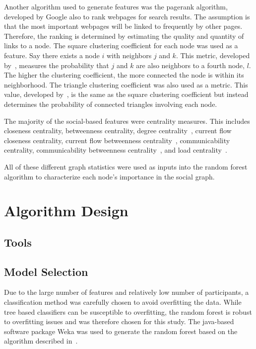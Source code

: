 \documentclass[12pt]{report}
\begin{document}
Another algorithm used to generate features was the pagerank algorithm, developed by Google \cite{page_pagerank_1999} also to rank webpages for search results.
The assumption is that the most important webpages will be linked to frequently by other pages.
Therefore, the ranking is determined by estimating the quality and quantity of links to a node.
The square clustering coefficient for each node was used as a feature.
Say there exists a node $i$ with neighbors $j$ and $k$.
This metric, developed by~\cite{lind_cycles_2005}, measures the probability that $j$ and $k$ are also neighbors to a fourth node, $l$.
The higher the clustering coefficient, the more connected the node is within its neighborhood.
The triangle clustering coefficient was also used as a metric.
This value, developed by~\cite{saramaki_generalizations_2007}, is the same as the square clustering coefficient but instead determines the probability of connected triangles involving each node.

The majority of the social-based features were centrality measures.
This includes closeness centrality, betweenness centrality, degree centrality~\cite{borgatti2011analyzing}, current flow closeness centrality, current flow betweenness centrality~\cite{brandes2005centrality}, communicability centrality, communicability betweenness centrality~\cite{estrada2008communicability}, and load centrality~\cite{newman2001scientific}.

All of these different graph statistics were used as inputs into the random forest algorithm to characterize each node's importance in the social graph.

\chapter{Algorithm Design} \label{Algorithm}
\section{Tools}
\section{Model Selection}
Due to the large number of features and relatively low number of participants, a classification method was carefully chosen to avoid overfitting the data.
While tree based classifiers can be susceptible to overfitting, the random forest is robust to overfitting issues and was therefore chosen for this study.
The java-based software package Weka was used to generate the random forest based on the algorithm described in~\cite{Breiman2001}.
\end{document}

